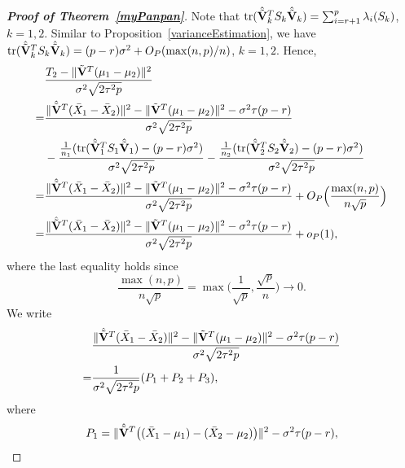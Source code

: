\documentclass[review]{elsarticle}
\DeclareMathOperator{\mytr}{tr}
\theoremstyle{plain}
\theoremstyle{definition}
\theoremstyle{remark}
\begin{document}
\begin{proof}[\textbf{Proof of Theorem~\ref{myPanpan}}]

    Note that $\mathrm{tr}(\hat{\tilde{\mathbf{V}}}_k^T S_k\hat{\tilde{\mathbf{V}}}_k)=\sum_{i=r+1}^p \lambda_i(S_k)$, $k=1,2$.
    Similar to Proposition~\ref{varianceEstimation}, we have $\mathrm{tr}(\hat{\tilde{\mathbf{V}}}_k^T S_k\hat{\tilde{\mathbf{V}}}_k)=(p-r)\sigma^2+O_P({\max(n,p)}/{n})$, $k=1,2$.
    Hence,
\begin{equation*}
    \begin{aligned}
        &\frac{T_2-\|\tilde{\BV}^T(\mu_1-\mu_2)\|^2}{\sigma^2\sqrt{2\tau^2 p}}\\
        =&
        \frac{\|\hat{\tilde{\BV}}^T(\bar{X}_1-\bar{X}_2)\|^2-\|\tilde{\BV}^T(\mu_1-\mu_2)\|^2
        -\sigma^2\tau (p-r)
        }{\sigma^2\sqrt{2\tau^2 p}}\\
        &-\frac{
        \frac{1}{n_1}(\mytr(\hat{\tilde{\BV}}_1^T S_1\hat{\tilde{\BV}}_1)-(p-r)\sigma^2)
        }{\sigma^2\sqrt{2\tau^2 p}}
-\frac{
        \frac{1}{n_2}(\mytr(\hat{\tilde{\BV}}_2^T S_2\hat{\tilde{\BV}}_2)-(p-r)\sigma^2)
        }{\sigma^2\sqrt{2\tau^2 p}}
        \\
        =&
        \frac{\|\hat{\tilde{\BV}}^T(\bar{X}_1-\bar{X}_2)\|^2-\|\tilde{\BV}^T(\mu_1-\mu_2)\|^2
        -\sigma^2\tau (p-r)
        }{\sigma^2\sqrt{2\tau^2 p}}
        +O_P\Big(\frac{\max(n,p)}{n\sqrt{p}}\Big)\\
        =&
        \frac{\|\hat{\tilde{\BV}}^T(\bar{X}_1-\bar{X}_2)\|^2-\|\tilde{\BV}^T(\mu_1-\mu_2)\|^2
        -\sigma^2\tau (p-r)
        }{\sigma^2\sqrt{2\tau^2 p}}+o_P(1),
    \end{aligned}
\end{equation*}
where the last equality holds since
    $$\frac{\max(n,p)}{n\sqrt{p}}=\max\Big(\frac{1}{\sqrt{p}},\frac{\sqrt{p}}{n}\Big)\to 0.$$
    We write
\begin{equation*}
    \begin{aligned}
        &\frac{\|\hat{\tilde{\mathbf{V}}}^T(\bar{X}_1-\bar{X}_2)\|^2-\|\tilde{\mathbf{V}}^T(\mu_1-\mu_2)\|^2
        -\sigma^2\tau (p-r)
        }{\sigma^2\sqrt{2\tau^2 p}}
        \\
        =&\frac{1}{\sigma^2\sqrt{2\tau^2 p}}(
        P_1+P_2+P_3
        ),
    \end{aligned}
\end{equation*}
where
\begin{align*}
    P_1&=\|\hat{\tilde{\BV}}^T\big((\bar{X}_1-\mu_1)-(\bar{X}_2-\mu_2)\big)\|^2-\sigma^2 \tau (p-r),\\

\end{align*}
\end{proof}
\end{document}
